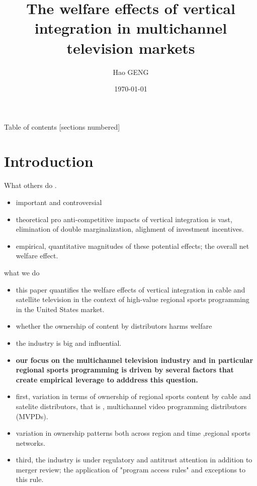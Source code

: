 \documentclass[10pt]{beamer}
\title{The welfare effects of vertical integration in multichannel television markets}
\subtitle{}
\date{\today}
\author{Hao GENG}
\institute{Department of Economics,CUHK}
\begin{document}
\maketitle

\begin{frame}{Table of contents}
  [sections numbered]
  \tableofcontents[hideallsubsections]
\end{frame}

\section{Introduction}

\begin{frame}[fragile]{What others do}
.   \begin{itemize}
    \item important and controversial
    \item theoretical pro anti-competitive impacts of vertical integration is vast, elimination of double marginalization, alighment of investment incentives.
    \item empirical, quantitative magnitudes of these potential effects; the overall net welfare effect.
\end{itemize}
\end{frame}
\begin{frame}[fragile]{what we do}
    \begin{itemize}
        \item this paper quantifies the welfare effects of vertical integration in cable and satellite television in the context of high-value regional sports programming in the United States market.
        \item whether the ownership of content by distributors harms welfare
        \item the industry is big and influential.
        \item \textbf{our focus on the multichannel television industry and in particular regional sports programming is driven by several factors that create empirical leverage to adddress this question.} 
        \item first, variation in terms of ownership of regional sports content by cable and satelite distributors, that is , multichannel video programming distributors (MVPDs). 
        \item variation in ownership patterns both across region and time ,regional sports networks.
        \item third, the industry is under regulatory and antitrust attention in addition to merger review; the application of "program access rules" and exceptions to this rule.
    \end{itemize}
\end{frame}
\end{document}
